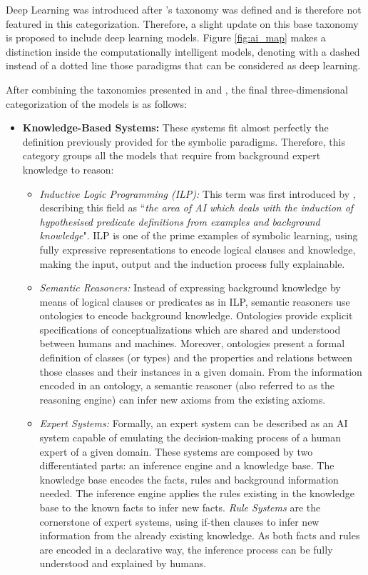 Deep Learning was introduced after \cite{hopgood_2009_knowledge-based}'s taxonomy was defined and is therefore not featured in this categorization. Therefore, a slight update on this base taxonomy is proposed to include deep learning models. Figure \ref{fig:ai_map} makes a distinction inside the computationally intelligent models, denoting with a dashed instead of a dotted line those paradigms that can be considered as deep learning. 

After combining the taxonomies presented in \cite{hopgood_2009_knowledge-based} and \cite{corea_ai_2019}, the final three-dimensional categorization of the models is as follows:
\begin{itemize}
    \item \textbf{Knowledge-Based Systems:} These systems fit almost perfectly the definition previously provided for the symbolic paradigms. Therefore, this category groups all the models that require from background expert knowledge to reason:
    \begin{itemize}
        \item \textit{Inductive Logic Programming (ILP):} This term was first introduced by \cite{Muggleton1991}, describing this field as ``\textit{the area of AI which deals with the induction of hypothesised predicate definitions from examples and background knowledge}". ILP is one of the prime examples of symbolic learning, using fully expressive representations to encode logical clauses and knowledge, making the input, output and the induction process fully explainable.
        \item \textit{Semantic Reasoners:} Instead of expressing background knowledge by means of logical clauses or predicates as in ILP, semantic reasoners use ontologies to encode background knowledge. Ontologies \citep{noy2001ontology} provide explicit specifications of conceptualizations which are shared and understood between humans and machines. Moreover, ontologies present a formal definition of classes (or types) and the properties and relations between those classes and their instances in a given domain. From the information encoded in an ontology, a semantic reasoner (also referred to as the reasoning engine) can infer new axioms from the existing axioms.
        \item \textit{Expert Systems:} Formally, an expert system can be described as an AI system capable of emulating the decision-making process of a human expert of a given domain. These systems are composed by two differentiated parts: an inference engine and a knowledge base. The knowledge base encodes the facts, rules and background information needed. The inference engine applies the rules existing in the knowledge base to the known facts to infer new facts. \textit{Rule Systems} are the cornerstone of expert systems, using if-then clauses to infer new information from the already existing knowledge. As both facts and rules are encoded in a declarative way, the inference process can be fully understood and explained by humans. 
        

\end{itemize}
\end{itemize}
